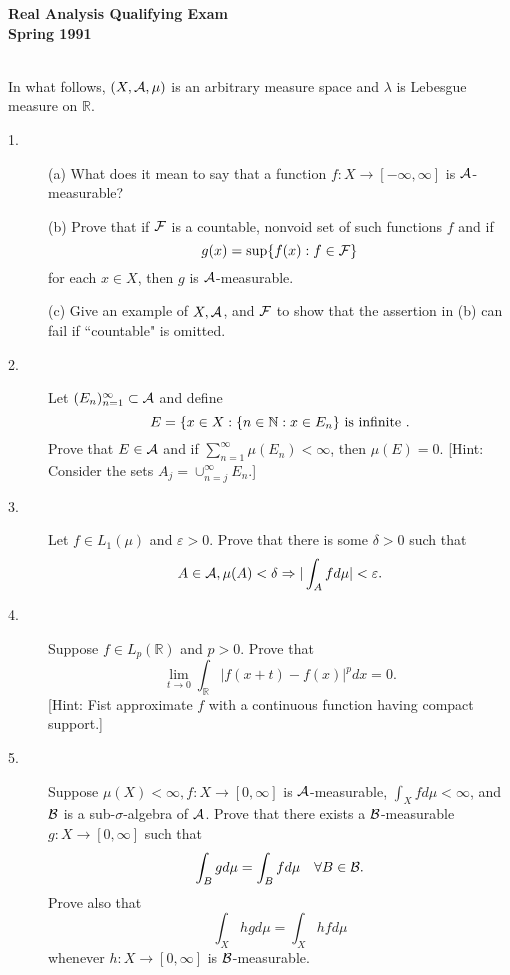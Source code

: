 \documentclass{article}
\def\R{\mathbb R}
\def\N{\mathbb N}
\begin{document}






\begin{center}\begin{LARGE}
{\bf Real Analysis Qualifying Exam}\\ 
{\bf Spring 1991}\\ \end{LARGE}
\end{center}
\vspace{0.1in}
\noindent\hrulefill\\

In what follows, $(X, {\cal A}, \mu)$ is an arbitrary measure space and
$\lambda$ is Lebesgue measure on $\R$.

\begin{description}
\item[1.](a)
What does it mean to say that a function $f:X \to [-\infty, \infty]$ is
${\cal A}$-measurable?

\item[\quad] (b)
Prove that if ${\cal F}$ is a countable, nonvoid set of such functions $f$
and if
$$g(x) = \sup \{f(x) : f\in {\cal F}\}$$
for each $x \in X$, then $g$ is ${\cal A}$-measurable.

\item[\quad] (c)
Give an example of $X, {\cal A}$, and ${\cal F}$ to show that the assertion in
(b) can fail if ``countable" is omitted.

\item[2.] Let $(E_n)^\infty_{n=1} \subset {\cal A}$ and define
$$E = \{x \in X :\{n \in \N : x \in E_n\} \hbox{\ is\ }
  \hbox{infinite\ }.$$
Prove that $E \in {\cal A}$ and if $\sum^\infty_{n=1} \mu (E_n) < \infty$,
then $\mu (E) = 0$. [Hint: Consider the sets
 $A_j = \cup^\infty_{n=j} E_n$.]

\item[3.]
Let $f \in L_1 (\mu)$ and $\varepsilon >0$. Prove that there is some
$\delta >0$ such that
$$A \in {\cal A}, \mu (A) < \delta \Rightarrow |\int_A fd\mu| <
 \varepsilon.$$

\item[4.]
Suppose $f \in L_p (\R)$ and $p>0$. Prove that
$$\lim_{t \to 0} \int_\R |f(x+t) - f(x) |^p dx =0.$$
[Hint: Fist approximate $f$ with a continuous function having compact
support.]

\item[5.]
Suppose $\mu(X) < \infty, f: X \to [0, \infty]$ is ${\cal A}$-measurable,
$\int_X fd\mu < \infty$, and ${\cal B}$ is a sub-$\sigma$-algebra of
${\cal A}$. Prove that there exists a ${\cal B}$-measurable
$g:X \to [0,\infty]$ such that
$$\int_B gd\mu = \int_B fd\mu \quad \forall B \in {\cal B}.$$
Prove also that
$$\int_X hgd\mu = \int_X hfd\mu$$
whenever $h:X \to [0,\infty]$ is ${\cal B}$-measurable.


\end{description}
\end{document}
